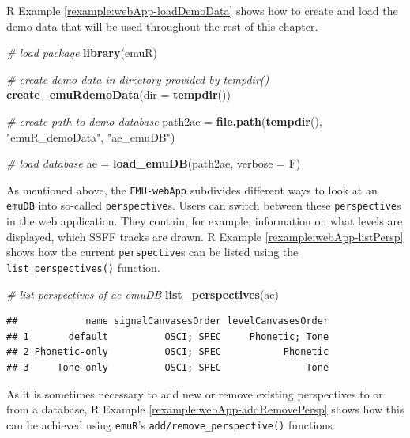 \documentclass[]{book}
\newenvironment{Shaded}{\begin{snugshade}}{\end{snugshade}}
\newcommand{\CommentTok}[1]{\textcolor[rgb]{0.56,0.35,0.01}{\textit{#1}}}
\newcommand{\DataTypeTok}[1]{\textcolor[rgb]{0.13,0.29,0.53}{#1}}
\newcommand{\KeywordTok}[1]{\textcolor[rgb]{0.13,0.29,0.53}{\textbf{#1}}}
\newcommand{\NormalTok}[1]{#1}
\newcommand{\StringTok}[1]{\textcolor[rgb]{0.31,0.60,0.02}{#1}}
\theoremstyle{definition}
\theoremstyle{definition}
\theoremstyle{definition}
\theoremstyle{remark}
\begin{document}
R Example \ref{rexample:webApp-loadDemoData} shows how to create and
load the demo data that will be used throughout the rest of this
chapter.

\begin{Shaded}
\begin{Highlighting}[]
\CommentTok{# load package}
\KeywordTok{library}\NormalTok{(emuR)}

\CommentTok{# create demo data in directory provided by tempdir()}
\KeywordTok{create_emuRdemoData}\NormalTok{(}\DataTypeTok{dir =} \KeywordTok{tempdir}\NormalTok{())}

\CommentTok{# create path to demo database}
\NormalTok{path2ae =}\StringTok{ }\KeywordTok{file.path}\NormalTok{(}\KeywordTok{tempdir}\NormalTok{(), }\StringTok{"emuR_demoData"}\NormalTok{, }\StringTok{"ae_emuDB"}\NormalTok{)}

\CommentTok{# load database}
\NormalTok{ae =}\StringTok{ }\KeywordTok{load_emuDB}\NormalTok{(path2ae, }\DataTypeTok{verbose =}\NormalTok{ F)}
\end{Highlighting}
\end{Shaded}

As mentioned above, the \texttt{EMU-webApp} subdivides different ways to
look at an \texttt{emuDB} into so-called \texttt{perspective}s. Users
can switch between these \texttt{perspective}s in the web application.
They contain, for example, information on what levels are displayed,
which SSFF tracks are drawn. R Example \ref{rexample:webApp-listPersp}
shows how the current \texttt{perspective}s can be listed using the
\texttt{list\_perspectives()} function.

\begin{Shaded}
\begin{Highlighting}[]
\CommentTok{# list perspectives of ae emuDB}
\KeywordTok{list_perspectives}\NormalTok{(ae)}
\end{Highlighting}
\end{Shaded}

\begin{verbatim}
##            name signalCanvasesOrder levelCanvasesOrder
## 1       default          OSCI; SPEC     Phonetic; Tone
## 2 Phonetic-only          OSCI; SPEC           Phonetic
## 3     Tone-only          OSCI; SPEC               Tone
\end{verbatim}

As it is sometimes necessary to add new or remove existing perspectives
to or from a database, R Example \ref{rexample:webApp-addRemovePersp}
shows how this can be achieved using \texttt{emuR}'s
\texttt{add/remove\_perspective()} functions.
\end{document}
